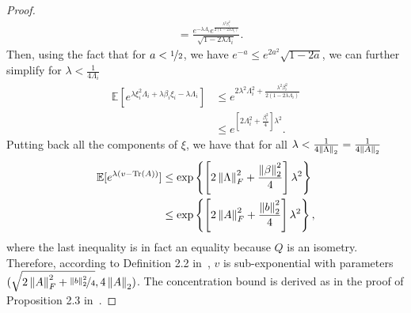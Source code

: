 \begin{proof}
\begin{align}
        &= 
        \frac{e^{-\lambda\Lambda_i}e^{\frac{\lambda^2\beta_i^2}{2(1-2\lambda\Lambda_i)}}}{\sqrt{1 - 2\lambda\Lambda_i}}.
    \end{align}
    Then, using the fact that for $a < \nicefrac{1}{2}$, we have $e^{-a} \leq e^{2a^2}\sqrt{1 - 2 a}$, we can further simplify for $\lambda < \frac{1}{4\Lambda_i}$
    \begin{align}
        \mathbb{E} \left[e^{\lambda\xi_i^2\Lambda_i + \lambda \beta_i\xi_i - \lambda\Lambda_i}\right] &\leq
        e^{2\lambda^2\Lambda_i^2 + \frac{\lambda^2\beta_i^2}{2(1-2\lambda\Lambda_i)}} \\
        &\leq
        e^{[2\Lambda_i^2 + \frac{\beta_i^2}{4}]\lambda^2}.
    \end{align}
    Putting back all the components of $\xi$, we have that for all $\lambda < \frac{1}{4\left\lVert\Lambda\right\rVert_2} = \frac{1}{4\left\lVert A\right\rVert_2}$
    \begin{align}
        \mathbb{E}[e^{\lambda(v-\operatorname{Tr}(A))}] &\leq \exp\left\{\left[2\left\lVert\Lambda\right\rVert^2_F + \frac{\left\lVert\beta\right\rVert_2^2}{4}\right]\lambda^2\right\} \\
        &\leq \exp\left\{\left[2\left\lVert A\right\rVert^2_F + \frac{\left\lVert b\right\rVert_2^2}{4}\right]\lambda^2\right\},
    \end{align}
    where the last inequality is in fact an equality because $Q$ is an isometry. Therefore, according to Definition 2.2 in~\cite{wainwright_2019}, $v$ is sub-exponential with parameters $(\sqrt{2\left\lVert A\right\rVert^2_F + \nicefrac{\left\lVert b\right\rVert_2^2}{4}}, 4\left\lVert A\right\rVert_2)$. The concentration bound is derived as in the proof of Proposition 2.3 in~\cite{wainwright_2019}.
    \end{proof}

